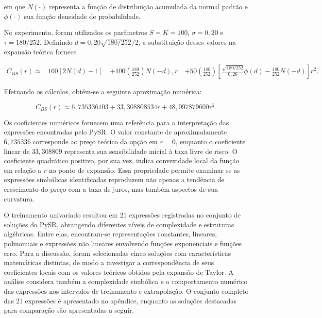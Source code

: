 em que $N(\cdot)$ representa a função de distribuição acumulada da normal padrão e $\phi(\cdot)$ sua função densidade de probabilidade.

No experimento, foram utilizados os parâmetros $S=K=100$, $\sigma=0{,}20$ e $\tau=180/252$. Definindo $d=0{,}20\sqrt{180/252}/2$, a substituição desses valores na expansão teórica fornece

\begin{equation}
\label{eq}
\begin{aligned}
C_{BS}(r)\approx{}&
100[2N(d)-1]\
&+100\left(\frac{180}{252}\right)N(-d),r\
&+50\left(\frac{180}{252}\right)
\left[
\frac{\sqrt{180/252}}{0{,}20}\phi(d)
-\frac{180}{252}N(-d)
\right]r^2.
\end{aligned}
\end{equation}

Efetuando os cálculos, obtém-se a seguinte aproximação numérica:

\begin{equation}
\label{eq}
\boxed{
C_{BS}(r)\approx
6{,}735336103
+33{,}308808534r
+48{,}097879600r^2.
}
\end{equation}

Os coeficientes numéricos fornecem uma referência para a interpretação das expressões encontradas pelo PySR. O valor constante de aproximadamente $6{,}735336$ corresponde ao preço teórico da opção em $r=0$, enquanto o coeficiente linear de $33{,}308809$ representa sua sensibilidade inicial à taxa livre de risco. O coeficiente quadrático positivo, por sua vez, indica convexidade local da função em relação a $r$ no ponto de expansão. Essa propriedade permite examinar se as expressões simbólicas identificadas reproduzem não apenas a tendência de crescimento do preço com a taxa de juros, mas também aspectos de sua curvatura.

O treinamento univariado resultou em 21 expressões registradas no conjunto de soluções do PySR, abrangendo diferentes níveis de complexidade e estruturas algébricas. Entre elas, encontram-se representações constantes, lineares, polinomiais e expressões não lineares envolvendo funções exponenciais e funções erro. Para a discussão, foram selecionadas cinco soluções com características matemáticas distintas, de modo a investigar a correspondência de seus coeficientes locais com os valores teóricos obtidos pela expansão de Taylor. A análise considera também a complexidade simbólica e o comportamento numérico das expressões nos intervalos de treinamento e extrapolação. O conjunto completo das 21 expressões é apresentado no apêndice, enquanto as soluções destacadas para comparação são apresentadas a seguir.


